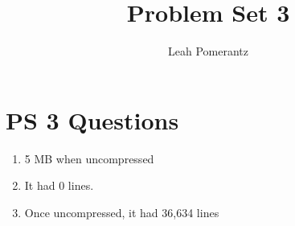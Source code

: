\documentclass{article}
\title{Problem Set 3}
\author{Leah Pomerantz}
\begin{document}
\maketitle


\section{PS 3 Questions}

\begin{enumerate}[label=(\alph*)]
  \item 5 MB when uncompressed
  \item It had 0 lines.
  \item Once uncompressed, it had 36,634 lines
\end{enumerate}
\end{document}

